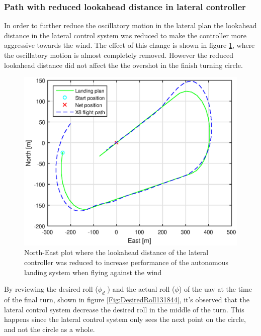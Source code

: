 \subsubsection{Path with reduced lookahead distance in lateral controller}
In order to further reduce the oscillatory motion in the lateral plan the lookahead distance in the lateral control system was reduced to make the controller more aggressive towards the wind. The effect of this change is shown in figure \ref{Fig:NorthEast31mai131844}, where the oscillatory motion is almost completely removed. However the reduced lookahead distance did not affect the the overshot in the finish turning circle.
\begin{figure}[H]
\centering
\includegraphics[scale=0.7]{figs/Experiment/NorthEast31mai131844.eps}
\caption{North-East plot where the lookahead distance of the lateral controller was reduced to increase performance of the autonomous landing system when flying against the wind}
\label{Fig:NorthEast31mai131844}
\end{figure}
By reviewing the desired roll ($\phi_d$ ) and the actual roll ($\phi$) of the \gls{uav} at the time of the final turn, shown in figure \ref{Fig:DesiredRoll131844}, it's observed that the lateral control system decrease the desired roll in the middle of the turn. This happens since the lateral control system only sees the next point on the circle, and not the circle as a whole.
